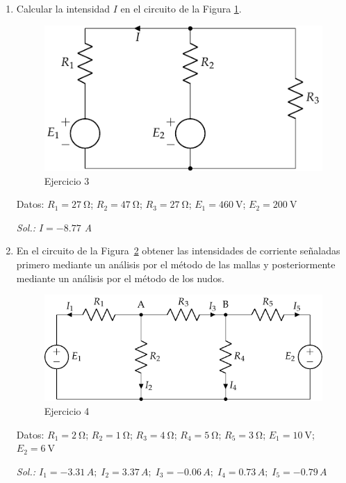 \begin{enumerate}
\item Calcular la intensidad $I$ en el circuito de la Figura \ref{fig.ejercicio4_tema1}. \\
  \begin{figure}[H]
    \centering \includegraphics{../figs/ej4_BT1.pdf}
    \caption{Ejercicio 3}
    \label{fig.ejercicio4_tema1}
  \end{figure}
  Datos: $R_1 = \qty{27}{\ohm}$; $R_2 = \qty{47}{\ohm}$; $R_3 = \qty{27}{\ohm}$; $E_1 = \qty{460}{\volt}$; $E_2 = \qty{200}{\volt}$

  \emph{Sol.: $I=-8.77 $ A}
		
\item En el circuito de la Figura~\ref{fig.ejercicio8-bt1} obtener las
  intensidades de corriente señaladas primero mediante un análisis por
  el método de las mallas y posteriormente mediante un análisis por el
  método de los nudos.
  \begin{figure}[H]
    \centering \includegraphics{../figs/ej8_BT1.pdf}
    \caption{Ejercicio 4}
    \label{fig.ejercicio8-bt1}
  \end{figure}

  Datos: $R_1 = \qty{2}{\ohm}$; $R_2 = \qty{1}{\ohm}$; $R_3 = \qty{4}{\ohm}$; $R_4 = \qty{5}{\ohm}$; $R_5 = \qty{3}{\ohm}$; $E_1 = \qty{10}{\volt}$; $E_2 = \qty{6}{\volt}$

  \emph{Sol.:
    $I_1=-3.31\,A;\;I_2=3.37\,{A};\; I_3=-0.06\,{A};\;
    I_4=0.73\,{A};\; I_5=-0.79\,A$}
 	

\end{enumerate}
